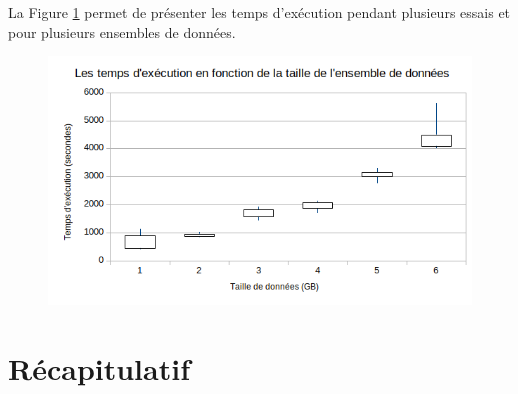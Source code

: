 La Figure 	\ref{fig:moustachespark} permet de présenter les temps d'exécution pendant plusieurs essais et pour plusieurs ensembles de données.
\begin{figure}[H]
	\centering
	\includegraphics[width=0.7\linewidth]{illustrations/moustacheSpark}
	\caption{}
	\label{fig:moustachespark}
\end{figure}


\section{Récapitulatif}

